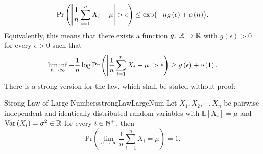 \documentclass[math, code]{amznotes}
\theoremstyle{remark}
\begin{document}
\begin{equation*}
    \mathrm{Pr}\left({\left\lvert {\frac{1}{n}\sum_{i = 1}^nX_i - \mu} \right\rvert} > \epsilon\right) \leq \exp\bigl(-ng\left(\epsilon\right) + o\left(n\right)\bigr).
\end{equation*}
Equivalently, this means that there exists a function $g \colon \mathbb{R} \to \mathbb{R}$ with $g\left(\epsilon\right) > 0$ for every $\epsilon > 0$ such that 
\begin{equation*}
    \liminf_{n \to \infty}-\frac{1}{n}\log\mathrm{Pr}\left({\left\lvert {\frac{1}{n}\sum_{i = 1}^nX_i - \mu} \right\rvert} > \epsilon\right) \geq g\left(\epsilon\right) + o\left(1\right).
\end{equation*}
There is a strong version for the law, which shall be stated without proof:
\begin{thmbox}{Strong Law of Large Numbers}{strongLawLargeNum}
    Let $X_1, X_2, \cdots, X_n$ be pairwise independent and identically distributed random variables with $\mathbb{E}[X_i] = \mu$ and $\mathrm{Var}\left(X_i\right) = \sigma^2 \in \mathbb{R}$ for every $i \in \mathbb{N}^+$, then 
    \begin{equation*}
        \mathrm{Pr}\left(\lim_{n \to \infty}\frac{1}{n}\sum_{i = 1}^{n}X_i = \mu\right) = 1.
    \end{equation*}
\end{thmbox}
\end{document}
